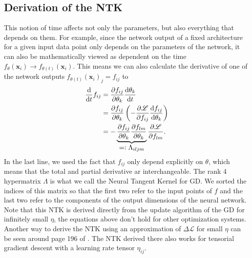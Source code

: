 \subsection{Derivation of the NTK}
This notion of time affects not only the parameters, but also everything that depends on them. For example, since the network output of a fixed architecture for a given input data point only depends on the parameters of the network, it can also be mathematically viewed as dependent on the time $f_{\theta}(\mathbf{x}_i) \rightarrow f_{\theta(t)}(\mathbf{x}_i)$. This means we can also calculate the derivative of one of the network outputs $f_{\theta(t)}(\mathbf{x}_i)_j = f_{ij}$ to
\begin{align}
	\tAbl{}{t} f_{ij} &= \pAbl{f_{ij}}{\theta_k}\tAbl{\theta_k}{t}\nonumber\\
	&= \pAbl{f_{ij}}{\theta_k} \left(- \pAbl{\mathscr{L}}{f_{ij}} \tAbl{f_{ij}}{\theta_k} \right)\label{eq:NTKarisesFromHere}\\
	&= - \underbrace{\pAbl{f_{ij}}{\theta_k} \pAbl{f_{lm}}{\theta_k}}_\mathlarger{=\vcentcolon \Lambda_{iljm}}
	\pAbl{\mathscr{L}}{f_{lm}}.\nonumber
\end{align}
In the last line, we used the fact that $f_{ij}$ only depend explicitly on $\theta$, which means that the total and partial derivative ar interchangeable.
The rank 4 hypermatrix $\Lambda$ is what we call the Neural Tangent Kernel for GD. We sorted the indices of this matrix so that the first two refer to the input points of $f$ and the last two refer to the components of the output dimensions of the neural network. Note that this NTK is derived directly from the update algorithm of the GD for infinitely small $\eta$, the equations above don't hold for other optimization systems.\\
Another way to derive the NTK using an approximation of $\Delta \mathscr{L}$ for small $\eta$ can be seen around page 196 of \cite{ThePrinciplesOfDeepLearningTheory}. The NTK derived there also works for tensorial gradient descent with a learning rate tensor $\eta_{ij}$.